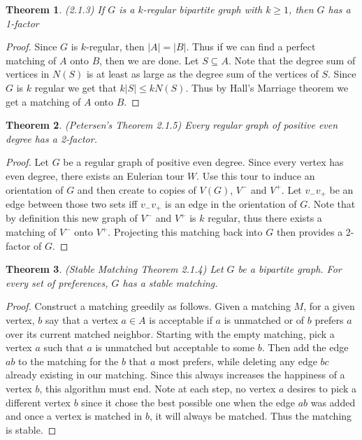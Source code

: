\documentclass[12pt]{article}
\newtheorem{theorem}{Theorem}
\begin{document}
\begin{theorem} (2.1.3) If $G$ is a $k$-regular bipartite graph with
  $k \geq 1$, then $G$ has a 1-factor
\end{theorem}
\begin{proof} Since $G$ is $k$-regular, then $|A| = |B|$. Thus if we
  can find a perfect matching of $A$ onto $B$, then we are done. Let
  $S \subseteq A$. Note that the degree sum of vertices in $N(S)$ is
  at least as large as the degree sum of the vertices of $S$. Since
  $G$ is $k$ regular we get that $k |S| \leq k N(S)$. Thus by Hall's
  Marriage theorem we get a matching of $A$ onto $B$.
\end{proof}

\begin{theorem} (Petersen's Theorem 2.1.5) Every regular graph of
  positive even degree has a 2-factor.
\end{theorem}
\begin{proof} Let $G$ be a regular graph of positive even
  degree. Since every vertex has even degree, there exists an Eulerian
  tour $W$. Use this tour to induce an orientation of $G$ and then
  create to copies of $V(G)$, $V^-$ and $V^+$. Let $v_- v_+$ be an
  edge between those two sets iff $v_- v_+$ is an edge in the
  orientation of $G$. Note that by definition this new graph of $V^-$
  and $V^+$ is $k$ regular, thus there exists a matching of $V^-$ onto
  $V^+$. Projecting this matching back into $G$ then provides a
  2-factor of $G$.
\end{proof}

\begin{theorem} (Stable Matching Theorem 2.1.4) Let $G$ be a bipartite
  graph. For every set of preferences, $G$ has a stable matching.
\end{theorem}
\begin{proof} Construct a matching greedily as follows. Given a
  matching $M$, for a given vertex, $b$ say that a vertex $a \in A$ is
  acceptable if $a$ is unmatched or of $b$ prefers $a$ over its
  current matched neighbor. Starting with the empty matching, pick a
  vertex $a$ such that $a$ is unmatched but acceptable to some
  $b$. Then add the edge $ab$ to the matching for the $b$ that $a$
  most prefers, while deleting any edge $bc$ already existing in our
  matching. Since this always increases the happiness of a vertex $b$,
  this algorithm must end. Note at each step, no vertex $a$ desires to
  pick a different vertex $b$ since it chose the best possible one
  when the edge $ab$ was added and once a vertex is matched in $b$, it
  will always be matched. Thus the matching is stable.
\end{proof}
\end{document}
